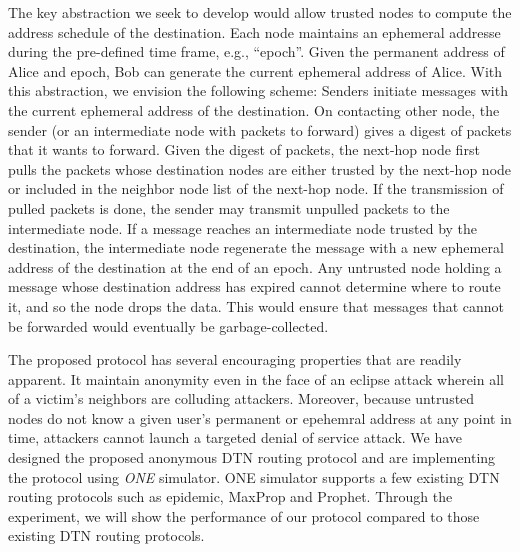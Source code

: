 \documentclass[11pt]{article}
\begin{document}
The key abstraction we seek to develop would allow trusted nodes to compute the address schedule of the destination. 
Each node maintains an ephemeral addresse during the pre-defined time frame, e.g., ``epoch''. 
Given the permanent address of Alice and epoch, Bob can generate the current ephemeral address of Alice. 
With this abstraction, we envision the following scheme: Senders initiate messages with the current ephemeral address of the destination. 
On contacting other node, the sender (or an intermediate node with packets to forward) gives a digest of packets that it wants to forward. 
Given the digest of packets, the next-hop node first pulls the packets whose destination nodes are either trusted by the next-hop node or included in the neighbor node list of the next-hop node. 
If the transmission of pulled packets is done, the sender may transmit unpulled packets to the intermediate node. 
If a message reaches an intermediate node trusted by the destination, the intermediate node regenerate the message with a new ephemeral address of the destination at the end of an epoch. 
Any untrusted node holding a message whose destination address has expired cannot determine where to route it, and so the node drops the data.
This would ensure that messages that cannot be forwarded would eventually be garbage­-collected.


The proposed protocol has several encouraging properties that are readily apparent. 
It maintain anonymity even in the face of an eclipse attack wherein all of a victim’s neighbors are colluding attackers. 
Moreover, because untrusted nodes do not know a given user’s permanent or epehemral address at any point in time, attackers cannot launch a targeted denial of service attack.
We have designed the proposed anonymous DTN routing protocol and are implementing the protocol using \textit{ONE} simulator. 
ONE simulator supports a few existing DTN routing protocols such as epidemic, MaxProp and Prophet. 
Through the experiment, we will show the performance of our protocol compared to those existing DTN routing protocols. 
\end{document}
